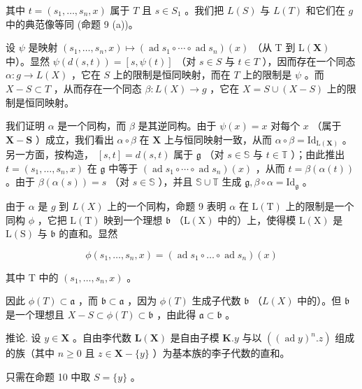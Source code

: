 其中 \(t = (s_1, \ldots, s_n, x)\) 属于 \(T\) 且 \(s \in S_1\) 。我们把 \(L(S)\) 与 \(L(T)\) 和它们在 \(g\) 中的典范像等同 (命题 9 (a))。

设 \(\psi\) 是映射 \((s_1, \ldots, s_n, x) \mapsto (\operatorname{ad} s_1 \circ \cdots \circ \operatorname{ad} s_n)(x)\) （从 T 到 \(\mathrm{L}(\mathbf{X})\) 中）。显然 \(\psi(d(s, t)) = [s, \psi(t)]\) （对 \(s \in S\) 与 \(t \in T\) ），因而存在一个同态 \(\alpha: g \to L(X)\) ，它在 \(S\) 上的限制是恒同映射，而在 \(T\) 上的限制是 \(\psi\) 。而 \(X - S \subset T\) ，从而存在一个同态 \(\beta: L(X) \to g\) ，它在 \(X = S \cup (X - S)\) 上的限制是恒同映射。

我们证明 \(\alpha\) 是一个同构，而 \(\beta\) 是其逆同构。由于 \(\psi(x) = x\) 对每个 \(x\) （属于 \(\mathbf{X} - \mathbf{S}\) ）成立，我们看出 \(\alpha \circ \beta\) 在 \(\mathbf{X}\) 上与恒同映射一致，从而 \(\alpha \circ \beta = \mathrm{Id}_{\mathrm{L}(\mathbf{X})}\) 。另一方面，按构造， \([s, t] = d(s, t)\) 属于 \(\mathfrak{g}\) （对 \(s \in \mathbb{S}\) 与 \(t \in \mathbb{T}\) ）；由此推出 \(t = (s_1, \ldots, s_n, x)\) 在 \(\mathfrak{g}\) 中等于 \((\operatorname{ad} s_1 \circ \cdots \circ \operatorname{ad} s_n)(x)\) ，从而 \(t = \beta(\alpha(t))\) 。由于 \(\beta(\alpha(s)) = s\) （对 \(s \in \mathbb{S}\) ），并且 \(\mathbb{S} \cup \mathbb{T}\) 生成 \(\mathfrak{g}, \beta \circ \alpha = \mathrm{Id}_{\mathfrak{g}}\) 。

由于 \(\alpha\) 是 \(g\) 到 \(L(X)\) 上的一个同构，命题 9 表明 \(\alpha\) 在 \(\mathrm{L(T)}\) 上的限制是一个同构 \(\phi\) ，它把 \(\mathrm{L(T)}\) 映到一个理想 \(\mathfrak{b}\) （\(\mathrm{L(X)}\) 中的）上，使得模 \(\mathrm{L(X)}\) 是 \(\mathrm{L(S)}\) 与 \(\mathfrak{b}\) 的直和。显然

\[
\phi (s _ {1}, \dots , s _ {n}, x) = (\operatorname{ad} s _ {1} \circ \dots \circ \operatorname{ad} s _ {n}) (x)
\]

其中 T 中的 \((s_1, \ldots, s_n, x)\) 。

因此 \(\phi(T) \subset \mathfrak{a}\) ，而 \(\mathfrak{b} \subset \mathfrak{a}\) ，因为 \(\phi(T)\) 生成子代数 \(\mathfrak{b}\) （\(L(X)\) 中的）。但 \(\mathfrak{b}\) 是一个理想且 \(X - S \subset \phi(T) \subset \mathfrak{b}\) ，由此得 \(\mathfrak{a} \subset \mathfrak{b}\) 。

推论. 设 \(y \in \mathbf{X}\) 。自由李代数 \(\mathbf{L}(\mathbf{X})\) 是自由子模 \(\mathbf{K}.y\) 与以 \(((\operatorname{ad}y)^n.z)\) 组成的族（其中 \(n \geqslant 0\) 且 \(z \in \mathbf{X} - \{y\}\) ）为基本族的李子代数的直和。

只需在命题 10 中取 \(S = \{y\}\) 。

